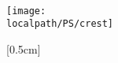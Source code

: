 \begin{titlepage}
\begin{center}
\vspace*{1.0cm}
\Huge
{\bf \xtitle}\\
\vspace*{2.5cm}
{\Large \bf
\xauthor\\
\xcollege\\
}
\vspace*{2.5cm}
\centerline{
\texttt{[image: \\localpath/PS/crest]}
}
\vspace*{1.5cm}
\normalsize

[0.5cm]
{\bf \xterm}\\

\vspace{2cm}

\end{center}
\end{titlepage}

